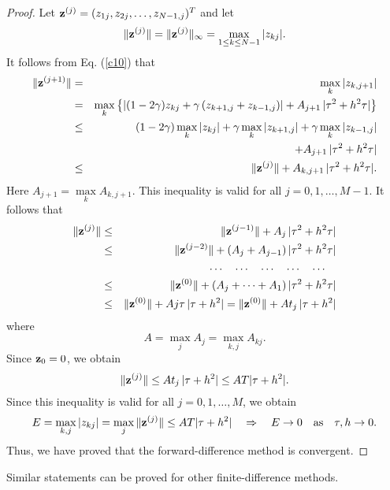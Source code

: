 \begin{proof}
\vskip 3mm  
Let ${\bf z}^{(j)}=(z_{1j}, z_{2j}, \dots, z_{N-1,j})^{T}$ and let
\[
\Vert {\bf z}^{(j)}\Vert =\Vert {\bf z}^{(j)}\Vert_{\infty}=
\max\limits_{1\leq k\leq N-1}\vert z_{kj}\vert .
\]
It follows from Eq. (\ref{c10}) that
\begin{eqnarray}
\Vert {\bf z}^{(j+1)} \Vert&=&\max\limits_{k}\vert z_{k,j+1} \vert\nonumber\\
&=&
\max\limits_{k}\left\{\left\vert
(1-2\gamma)z_{kj}+\gamma
\left(z_{k+1,j}+z_{k-1,j}\right)\right\vert + A_{j+1} \, \vert\tau^2+h^{2}\tau\vert\right\} \nonumber \\
&\leq&(1 -2\gamma)\max\limits_{k}\vert z_{kj}\vert+
\gamma\max\limits_{k}\vert z_{k+1,j}\vert +
\gamma\max\limits_{k}\vert z_{k-1,j}\vert\nonumber\\
&&\qquad\qquad
+A_{j+1} \, \vert\tau^2+h^{2}\tau\vert \nonumber \\
&\leq&\Vert {\bf z}^{(j)} \Vert+A_{k,j+1} \, \vert\tau^2+h^{2}\tau\vert. \nonumber
\end{eqnarray}
Here $A_{j+1}=\max\limits_{k}A_{k,j+1}$.
This inequality is valid for all $j=0,1,\dots,M-1$.
It follows that
\begin{eqnarray}
\Vert {\bf z}^{(j)} \Vert&\leq&
\Vert {\bf z}^{(j-1)} \Vert +A_{j} \, \vert\tau^2+h^{2}\tau\vert \nonumber \\
&\leq&\Vert {\bf z}^{(j-2)} \Vert +(A_{j}+A_{j-1}) \, \vert\tau^2+h^{2}\tau\vert \nonumber \\
&&\dots\quad \dots\quad \dots\quad \dots\quad \dots\quad \nonumber \\
&\leq&\Vert {\bf z}^{(0)} \Vert +(A_{j}+\dots +A_{1})\, \vert\tau^2+h^{2}\tau\vert \nonumber \\
&\leq&\Vert {\bf z}^{(0)} \Vert +Aj\tau \, \vert\tau+h^{2}\vert=\Vert {\bf z}^{(0)} \Vert +
A t_{j} \, \vert\tau+h^{2}\vert \nonumber
\end{eqnarray}
where
\[
A=\max_{j}A_{j}=\max_{k,j}A_{kj}.
\]
Since ${\bf z}_{0}=0$, we obtain
\begin{equation}
\Vert {\bf z}^{(j)} \Vert \leq A t_{j} \, \vert\tau+h^{2}\vert \leq A T \vert\tau+h^{2}\vert. \label{c13}
\end{equation}
Since this inequality is valid for all $j=0,1,\dots,M$, we obtain
\[
E= \max\limits_{k,j}\vert z_{kj} \vert=\max\limits_{j}\Vert {\bf z}^{(j)} \Vert\leq A T \vert\tau+h^{2}\vert \quad \Rightarrow \quad E\to 0 \quad {\rm as} \quad \tau,h\to 0.
\]
Thus, we have proved that the forward-difference method is convergent.
\end{proof}
Similar statements can be proved for other finite-difference methods.
 
